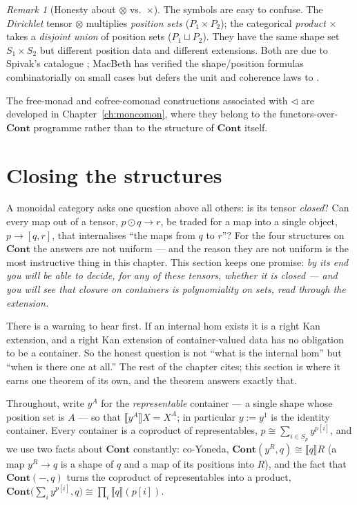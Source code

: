 \documentclass[11pt,a4paper]{book}
\newcommand{\Cont}{\mathbf{Cont}}
\newcommand{\Ext}[1]{\llbracket #1 \rrbracket}
\theoremstyle{plain}
\theoremstyle{definition}
\theoremstyle{remark}
\newtheorem{Remark}[Theorem]{Remark}
\begin{document}
\begin{Remark}[Honesty about $\otimes$ vs.\ $\times$]
The symbols are easy to confuse. The \emph{Dirichlet} tensor $\otimes$ multiplies
\emph{position sets} ($P_1\times P_2$); the categorical \emph{product} $\times$
takes a \emph{disjoint union} of position sets ($P_1\sqcup P_2$). They have the
same shape set $S_1\times S_2$ but different position data and different
extensions. Both are due to Spivak's catalogue \cite{Spivak21}; MacBeth has
verified the shape/position formulas combinatorially on small cases but defers
the unit and coherence laws to \cite{Spivak21}.
\end{Remark}

The free-monad and cofree-comonad constructions associated with $\triangleleft$
are developed in Chapter~\ref{ch:moncomon}, where they belong to the functors-over-$\Cont$
programme rather than to the structure of $\Cont$ itself.

\section{Closing the structures}
\label{sec:closed}

A monoidal category asks one question above all others: is its tensor
\emph{closed}? Can every map out of a tensor, $p\odot q\to r$, be traded for a
map into a single object, $p\to[q,r]$, that internalises ``the maps from $q$ to
$r$''? For the four structures on $\Cont$ the answers are not uniform --- and the
reason they are not uniform is the most instructive thing in this chapter. This
section keeps one promise: \emph{by its end you will be able to decide, for any of
these tensors, whether it is closed --- and you will see that closure on
containers is polynomiality on sets, read through the extension.}

There is a warning to hear first. If an internal hom exists it is a right Kan
extension, and a right Kan extension of container-valued data has no obligation to
be a container. So the honest question is not ``what is the internal hom'' but
``when is there one at all.'' The rest of the chapter cites; this section is where
it earns one theorem of its own, and the theorem answers exactly that.

Throughout, write $y^A$ for the \emph{representable} container --- a single shape
whose position set is $A$ --- so that $\Ext{y^A}X=X^A$; in particular $y:=y^1$ is
the identity container. Every container is a coproduct of representables,
$p\cong\sum_{i\in S_p}y^{p[i]}$, and we use two facts about $\Cont$ constantly:
co-Yoneda, $\Cont(y^R,q)\cong\Ext qR$ (a map $y^R\to q$ is a shape of $q$ and a
map of its positions into $R$), and the fact that $\Cont(-,q)$ turns the coproduct
of representables into a product, $\Cont\bigl(\sum_i y^{p[i]},q\bigr)\cong\prod_i\Ext q{(p[i])}$.
\end{document}
